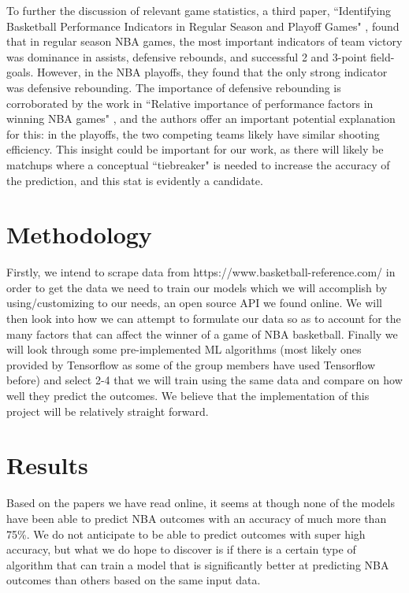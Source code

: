 \documentclass[letterpaper]{article} %
\begin{document}
To further the discussion of relevant game statistics, a third paper, ``Identifying Basketball Performance Indicators in Regular Season and Playoff Games" \cite{IdentifyingBasketballPerformanceIndicatorsinRegularSeasonandPlayoffGames}, found that in regular season NBA games, the most important indicators of team victory was dominance in assists, defensive rebounds,  and successful 2 and 3-point field-goals. However, in the NBA playoffs, they found that the only strong indicator was defensive rebounding. The importance of defensive rebounding is corroborated by the work in ``Relative importance of performance factors in winning NBA games" \cite{RelativeImportanceofPerformanceFactorsinWinningNBAGamesinRegularSeasonversusPlayoffs}, and the authors offer an important potential explanation for this: in the playoffs, the two competing teams likely have similar shooting efficiency. This insight could be important for our work, as there will likely be matchups where a conceptual ``tiebreaker" is needed to increase the accuracy of the prediction, and this stat is evidently a candidate.


\section{Methodology}

Firstly, we intend to scrape data from https://www.basketball-reference.com/ in order to get the data we need to train our models which we will accomplish by using/customizing to our needs, an open source API we found online. We will then look into how we can attempt to formulate our data so as to account for the many factors that can affect the winner of a game of NBA basketball. Finally we will look through some pre-implemented ML algorithms (most likely ones provided by Tensorflow as some of the group members have used Tensorflow before) and select 2-4 that we will train using the same data and compare on how well they predict the outcomes. We believe that the implementation of this project will be relatively straight forward. 


\section{Results}

Based on the papers we have read online, it seems at though none of the models have been able to predict NBA outcomes with an accuracy of much more than 75\%. We do not anticipate to be able to predict outcomes with super high accuracy, but what we do hope to discover is if there is a certain type of algorithm that can train a model that is significantly better at predicting NBA outcomes than others based on the same input data.

\newpage


\end{document}
